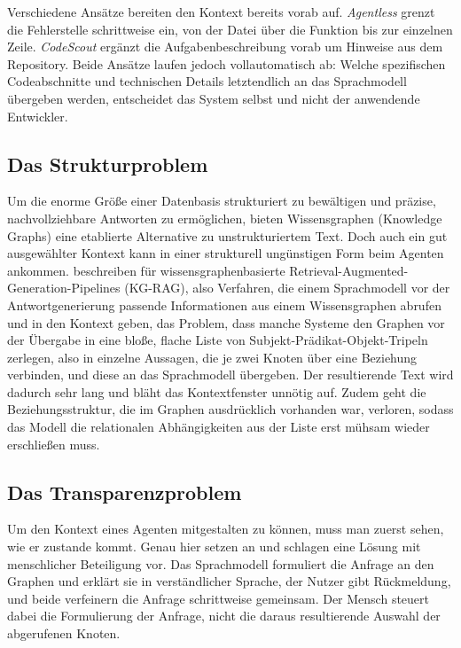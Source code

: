 Verschiedene Ansätze bereiten den Kontext bereits vorab auf. \textit{Agentless} \parencite{xia2024agentless} grenzt die Fehlerstelle schrittweise ein, von der Datei über die Funktion bis zur einzelnen Zeile. \textit{CodeScout} \parencite{suri2026codescout} ergänzt die Aufgabenbeschreibung vorab um Hinweise aus dem Repository. Beide Ansätze laufen jedoch vollautomatisch ab: Welche spezifischen Codeabschnitte und technischen Details letztendlich an das Sprachmodell übergeben werden, entscheidet das System selbst und nicht der anwendende Entwickler.

\subsection{Das Strukturproblem}

Um die enorme Größe einer Datenbasis strukturiert zu bewältigen und präzise, nachvollziehbare Antworten zu ermöglichen, bieten Wissensgraphen (Knowledge Graphs) eine etablierte Alternative zu unstrukturiertem Text. Doch auch ein gut ausgewählter Kontext kann in einer strukturell ungünstigen Form beim Agenten ankommen. \textcite{pusch2026hitlkgqa} beschreiben für wissensgraphenbasierte Retrieval-Augmented-Generation-Pipelines (KG-RAG), also Verfahren, die einem Sprachmodell vor der Antwortgenerierung passende Informationen aus einem Wissensgraphen abrufen und in den Kontext geben, das Problem, dass manche Systeme den Graphen vor der Übergabe in eine bloße, flache Liste von Subjekt-Prädikat-Objekt-Tripeln zerlegen, also in einzelne Aussagen, die je zwei Knoten über eine Beziehung verbinden, und diese an das Sprachmodell übergeben. Der resultierende Text wird dadurch sehr lang und bläht das Kontextfenster unnötig auf. Zudem geht die Beziehungsstruktur, die im Graphen ausdrücklich vorhanden war, verloren, sodass das Modell die relationalen Abhängigkeiten aus der Liste erst mühsam wieder erschließen muss.

\subsection{Das Transparenzproblem}

Um den Kontext eines Agenten mitgestalten zu können, muss man zuerst sehen, wie er zustande kommt. Genau hier setzen \textcite{pusch2026hitlkgqa} an und schlagen eine Lösung mit menschlicher Beteiligung vor. Das Sprachmodell formuliert die Anfrage an den Graphen und erklärt sie in verständlicher Sprache, der Nutzer gibt Rückmeldung, und beide verfeinern die Anfrage schrittweise gemeinsam. Der Mensch steuert dabei die Formulierung der Anfrage, nicht die daraus resultierende Auswahl der abgerufenen Knoten.

